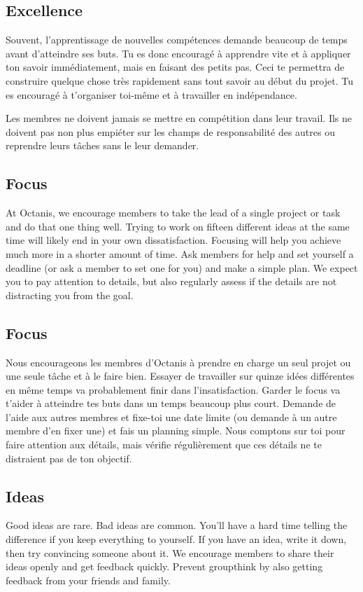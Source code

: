 	\subsection{Excellence}
	Souvent, l'apprentissage de nouvelles compétences demande beaucoup de temps avant d'atteindre ses buts. Tu es donc encouragé à apprendre vite et à appliquer ton savoir immédiatement, mais en faisant des petits pas. Ceci te permettra de construire quelque chose très rapidement sans tout savoir au début du projet. Tu es encouragé à t'organiser toi-même et à travailler en indépendance. 

	Les membres ne doivent jamais se mettre en compétition dans leur travail. Ils ne doivent pas non plus empiéter sur les champs de responsabilité des autres ou reprendre leurs tâches sans le leur demander.


	
\english
	\subsection{Focus}
	At Octanis, we encourage members to take the lead of a single project or task and do that one thing well. Trying to work on fifteen different ideas at the same time will likely end in your own dissatisfaction. Focusing will help you achieve much more in a shorter amount of time. Ask members for help and set yourself a deadline (or ask a member to set one for you) and make a simple plan.
	We expect you to pay attention to details, but also regularly assess if the details are not distracting you from the goal.

	\vspace{0.5cm}


\french
	\subsection{Focus}
	Nous encourageons les membres d'Octanis à prendre en charge un seul projet ou une seule tâche et à le faire bien. Essayer de travailler sur quinze idées différentes en même temps va probablement finir dans l'insatisfaction. Garder le focus va t'aider à atteindre tes buts dans un temps beaucoup plus court. Demande de l'aide aux autres membres et fixe-toi une date limite (ou demande à un autre membre d'en fixer une) et fais un planning simple. 
	Nous comptons sur toi pour faire attention aux détails, mais vérifie régulièrement que ces détails ne te distraient pas de ton objectif. 
	

\english
	\subsection{Ideas}
	Good ideas are rare. Bad ideas are common. You'll have a hard time telling the difference if you keep everything to yourself.
	If you have an idea, write it down, then try convincing someone about it. We encourage members to share their ideas openly and get feedback quickly. Prevent groupthink by also getting feedback from your friends and family.

